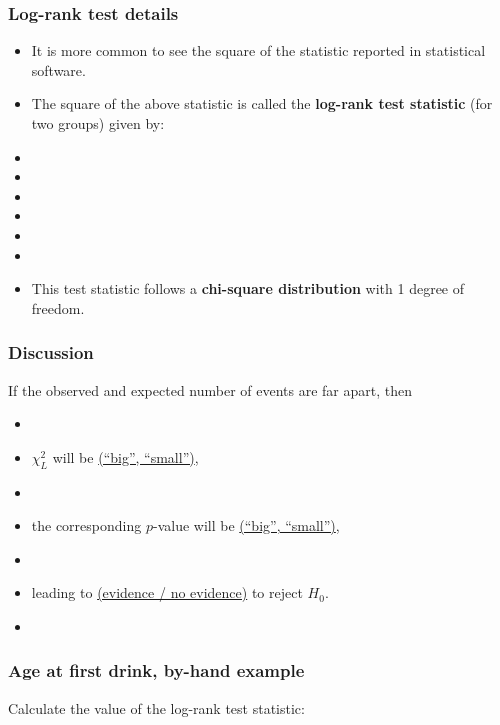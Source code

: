 \begin{frame}
\frametitle{Log-rank test details}
\begin{itemize}
\item It is more common to see the square of the statistic reported in statistical software.

\item The square of the above statistic is called the \textbf{log-rank test statistic} (for two groups)
given by:
\item[]
\item[]
\item[]
\item[]
\item[]
\item[]

\item This test statistic follows a \textbf{chi-square distribution} with 1
degree of freedom.


\end{itemize}
\end{frame}

\begin{frame}
\frametitle{Discussion}
If the observed and expected number of events are far apart, then
\begin{itemize}
\item[]
\item $\chi^2_L$ will be \underline{(``big'', ``small'')},
\item[]
\item the corresponding $p$-value will be \underline{(``big'', ``small'')},
\item[]
\item leading to \underline{(evidence / no evidence)} to reject $H_0$.
\item[]
\end{itemize}
\end{frame}

\begin{frame}
\frametitle{Age at first drink, by-hand example}
Calculate the value of the log-rank test statistic:
\vskip300pt
\end{frame}

